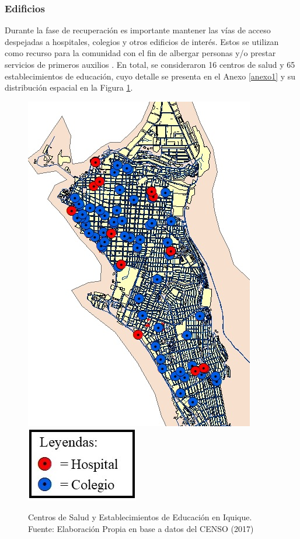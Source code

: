 \documentclass[letterpaper,conference]{IEEEtran}
\begin{document}
\subsubsection{Edificios}

Durante la fase de recuperación es importante mantener las vías de acceso despejadas a hospitales, colegios y otros edificios de interés. Estos se utilizan como recurso para la comunidad con el fin de albergar personas y/o prestar servicios de primeros auxilios \citet{lindell2006wiley}. En total, se consideraron 16 centros de salud y 65 establecimientos de educación, cuyo detalle se presenta en el Anexo \ref{anexo1} y su distribución espacial en la Figura \ref{fig:fig3}.

\begin{figure}[h!]
	\centering
	\includegraphics[scale=0.55]{Figuras/mapaarc.JPG}
	\includegraphics[scale=0.5]{Figuras/simb1.jpg}
	\caption{Centros de Salud y Establecimientos de Educación en Iquique. Fuente: Elaboración Propia en base a datos del CENSO (2017)}
	\label{fig:fig3}
\end{figure}
\end{document}
